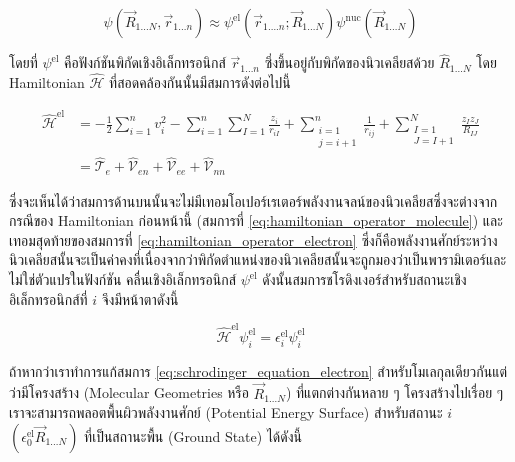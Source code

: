 \begin{equation}
    \psi\left(\vec{R}_{1 \ldots N}, \vec{r}_{1 \ldots n}\right)
    \approx
    \psi^{\mathrm{el}}\left(\vec{r}_{1 \ldots . n} ; \vec{R}_{1 \ldots N}\right)
    \psi^{\mathrm{nuc}}\left(\vec{R}_{1 \ldots N}\right)
\end{equation}

\noindent โดยที่ $\psi^{\mathrm{el}}$ คือฟังก์ชันพิกัดเชิงอิเล็กทรอนิกส์ $\vec{r}_{1 \ldots n}$ ซึ่งขึ้นอยู่กับพิกัดของนิวเคลียสด้วย
$\hat{R}_{1 \ldots N}$ โดย Hamiltonian $\hat{\mathscr{H}}$ ที่สอดคล้องกันนั้นมีสมการดังต่อไปนี้

\begin{equation}
    \label{eq:hamiltonian_operator_electron}
    \begin{aligned}
        \hat{\mathscr{H}}^{\mathrm{el}}
         & = -\frac{1}{2} \sum_{i=1}^{n} v_{i}^{2}
        - \sum_{i=1}^{n} \sum_{I=1}^{N} \frac{z_{i}}{r_{i I}}
        + \sum_{\substack{i=1                      \\ j=i+1}}^{n} \frac{1}{r_{i j}}
        + \sum_{\substack{I=1                      \\ J=I+1}}^{N} \frac{z_{I} z_{J}}{R_{I J}} \\
         & = \hat{\mathscr{T}}_{e}
        + \hat{\mathscr{V}}_{en}
        + \hat{\mathscr{V}}_{ee}
        + \hat{\mathscr{V}}_{nn}
    \end{aligned}
\end{equation}

\noindent ซึ่งจะเห็นได้ว่าสมการด้านบนนั้นจะไม่มีเทอมโอเปอร์เรเตอร์พลังงานจลน์ของนิวเคลียสซึ่งจะต่างจากกรณีของ Hamiltonian ก่อนหน้านี้
(สมการที่ \ref{eq:hamiltonian_operator_molecule}) และเทอมสุดท้ายของสมการที่ \ref{eq:hamiltonian_operator_electron}
ซึ่งก็คือพลังงานศักย์ระหว่างนิวเคลียสนั้นจะเป็นค่าคงที่เนื่องจากว่าพิกัดตำแหน่งของนิวเคลียสนั้นจะถูกมองว่าเป็นพารามิเตอร์และไม่ใช่ตัวแปรในฟังก์ชัน%
คลื่นเชิงอิเล็กทรอนิกส์ $\psi^{\text{el}}$ ดังนั้นสมการชโรดิงเงอร์สำหรับสถานะเชิงอิเล็กทรอนิกส์ที่ $i$ จึงมีหน้าตาดังนี้

\begin{equation}
    \label{eq:schrodinger_equation_electron}
    \hat{\mathscr{H}}^{\text{el}} \psi^{\text{el}}_{i}
    =
    \epsilon^{\text{el}}_{i} \psi^{\text{el}}_{i}
\end{equation}

ถ้าหากว่าเราทำการแก้สมการ \ref{eq:schrodinger_equation_electron} สำหรับโมเลกุลเดียวกันแต่ว่ามีโครงสร้าง (Molecular Geometries
หรือ $\vec{R}_{1 \dots N}$) ที่แตกต่างกันหลาย ๆ โครงสร้างไปเรื่อย ๆ เราจะสามารถพลอตพื้นผิวพลังงานศักย์ (Potential Energy Surface)
สำหรับสถานะ $i$ $(\epsilon^{\text{el}}_{0} \vec{R}_{1 \dots N})$ ที่เป็นสถานะพื้น (Ground State) ได้ดังนี้

